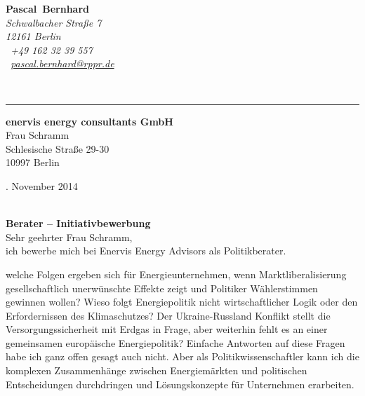 \documentclass[11pt,a4paper]{article}
\def\firstname{Pascal}
\def\familyname{Bernhard}
\begin{document}
\sffamily   %
\hfill%
\begin{minipage}[t]{.6\textwidth}
	\raggedleft%
	{\bfseries {\color{firstnamecolor}\firstname}~{\color{familynamecolor}\familyname}}\\[.35ex]
	\small\itshape%
	Schwalbacher Straße 7\\
	12161 Berlin\\[.35ex]
	\Mobilefone~+49 162 32 39 557 \\
	\Letter~\href{mailto:pascal.bernhard@rppr.de}{pascal.bernhard@rppr.de}
\end{minipage}\\[0.5em]
%
{\color{firstnamecolor}\rule{\textwidth}{.25ex}}
%
\begin{minipage}[t]{.4\textwidth}
	\raggedright%
	\vspace*{1em}
	\textbf{enervis energy consultants GmbH} \\
	Frau Schramm \\[.35ex]
	\small%
	Schlesische Straße 29-30\\
	10997 Berlin
\end{minipage}
%
\hfill
%
\begin{minipage}[t]{.4\textwidth}
	. November 2014
\end{minipage}\\[1em]


{\bfseries \color{familynamecolor}Berater -- Initiativbewerbung}\\[0.75em]

Sehr geehrter Frau Schramm,\\[0.5em]
%
ich bewerbe mich bei Enervis Energy Advisors als Politikberater.


welche Folgen ergeben sich für Energieunternehmen, wenn Marktliberalisierung gesellschaftlich unerwünschte Effekte zeigt und Politiker Wählerstimmen gewinnen wollen? Wieso folgt Energiepolitik nicht wirtschaftlicher Logik oder den Erfordernissen des Klimaschutzes? Der Ukraine-Russland Konflikt stellt die Versorgungssicherheit mit Erdgas in Frage, aber weiterhin fehlt es an einer gemeinsamen europäische Energiepolitik? Einfache Antworten auf diese Fragen habe ich ganz offen gesagt auch nicht. Aber als Politikwissenschaftler kann ich die komplexen Zusammenhänge zwischen Energiemärkten und politischen Entscheidungen durchdringen und Lösungskonzepte für Unternehmen erarbeiten.
\end{document}
